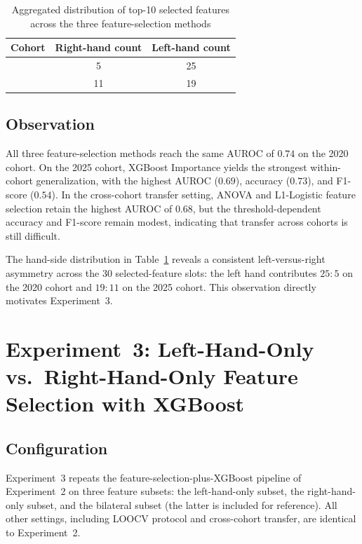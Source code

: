 \begin{table}[H]
    \centering
    \caption{Aggregated distribution of top-10 selected features across the three feature-selection methods}
    \label{tab:fs_topk_hand_distribution}
    \small
    \setlength{\tabcolsep}{8pt}
    \begin{tabularx}{\linewidth}{>{\raggedright\arraybackslash}X c c}
        \hline
        Cohort & Right-hand count & Left-hand count \\
        \hline
        2020 & 5  & 25 \\
        2025 & 11 & 19 \\
        \hline
    \end{tabularx}
\end{table}

\subsection{Observation}

All three feature-selection methods reach the same AUROC of $0.74$ on the 2020 cohort. On the 2025 cohort, XGBoost Importance yields the strongest within-cohort generalization, with the highest AUROC ($0.69$), accuracy ($0.73$), and F1-score ($0.54$). In the cross-cohort transfer setting, ANOVA and L1-Logistic feature selection retain the highest AUROC of $0.68$, but the threshold-dependent accuracy and F1-score remain modest, indicating that transfer across cohorts is still difficult.

The hand-side distribution in Table~\ref{tab:fs_topk_hand_distribution} reveals a consistent left-versus-right asymmetry across the 30 selected-feature slots: the left hand contributes $25{:}5$ on the 2020 cohort and $19{:}11$ on the 2025 cohort. This observation directly motivates Experiment~3.

\section{Experiment~3: Left-Hand-Only vs.\ Right-Hand-Only Feature Selection with XGBoost}
\label{sec:exp3}

\subsection{Configuration}

Experiment~3 repeats the feature-selection-plus-XGBoost pipeline of Experiment~2 on three feature subsets: the left-hand-only subset, the right-hand-only subset, and the bilateral subset (the latter is included for reference). All other settings, including LOOCV protocol and cross-cohort transfer, are identical to Experiment~2.

